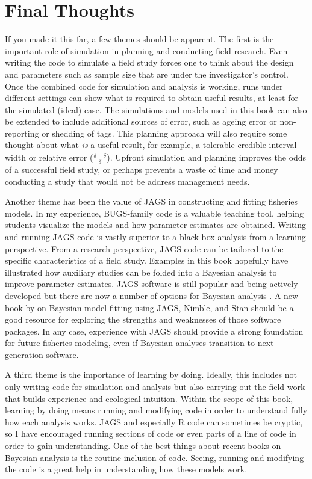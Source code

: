 \documentclass[
]{krantz}
\begin{document}
\hypertarget{FinalThoughts}{%
\chapter{Final Thoughts}\label{FinalThoughts}}

If you made it this far, a few themes should be apparent. The first is the important role of simulation in planning and conducting field research. Even writing the code to simulate a field study forces one to think about the design and parameters such as sample size that are under the investigator's control. Once the combined code for simulation and analysis is working, runs under different settings can show what is required to obtain useful results, at least for the simulated (ideal) case. The simulations and models used in this book can also be extended to include additional sources of error, such as ageing error or non-reporting or shedding of tags. This planning approach will also require some thought about what \emph{is} a useful result, for example, a tolerable credible interval width or relative error (\(\frac{\hat{\delta}-\delta}{\delta}\)). Upfront simulation and planning improves the odds of a successful field study, or perhaps prevents a waste of time and money conducting a study that would not be address management needs.

Another theme has been the value of JAGS in constructing and fitting fisheries models. In my experience, BUGS-family code is a valuable teaching tool, helping students visualize the models and how parameter estimates are obtained. Writing and running JAGS code is vastly superior to a black-box analysis from a learning perspective. From a research perspective, JAGS code can be tailored to the specific characteristics of a field study. Examples in this book hopefully have illustrated how auxiliary studies can be folded into a Bayesian analysis to improve parameter estimates. JAGS software is still popular and being actively developed but there are now a number of options for Bayesian analysis \citep{strumbelj.etal_2024}. A new book by \citet{kery.kellner_2024} on Bayesian model fitting using JAGS, Nimble, and Stan should be a good resource for exploring the strengths and weaknesses of those software packages. In any case, experience with JAGS should provide a strong foundation for future fisheries modeling, even if Bayesian analyses transition to next-generation software.

A third theme is the importance of learning by doing. Ideally, this includes not only writing code for simulation and analysis but also carrying out the field work that builds experience and ecological intuition. Within the scope of this book, learning by doing means running and modifying code in order to understand fully how each analysis works. JAGS and especially R code can sometimes be cryptic, so I have encouraged running sections of code or even parts of a line of code in order to gain understanding. One of the best things about recent books on Bayesian analysis is the routine inclusion of code. Seeing, running and modifying the code is a great help in understanding how these models work.
\end{document}

